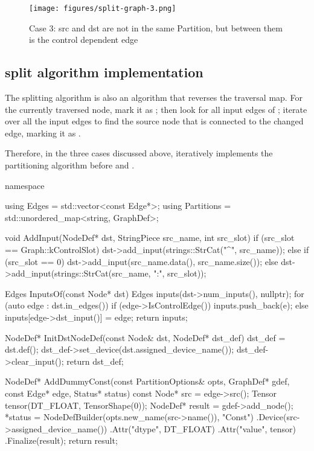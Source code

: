 \begin{content}
\begin{figure}[H]
\centering
\texttt{[image: figures/split-graph-3.png]}
\caption{Case 3: src and dst are not in the same Partition, but between them is the control dependent edge}
 \label{fig:split-graph-3}
\end{figure}

\subsection{split algorithm implementation}

The splitting algorithm is also an algorithm that reverses the traversal map. For the currently traversed node, mark it as ; then look for all input edges of ; iterate over all the input edges to find the source node that is connected to the changed edge, marking it as .

Therefore, in the three cases discussed above, iteratively implements the  partitioning algorithm before  and .

\begin{leftbar}
\begin{c++}
namespace {
  
  using Edges = std::vector<const Edge*>;
  using Partitions = std::unordered_map<string, GraphDef>;

  void AddInput(NodeDef* dst, StringPiece src_name, int src_slot) {
    if (src_slot == Graph::kControlSlot) {
      dst->add_input(strings::StrCat("^", src_name));
    } else if (src_slot == 0) {
      dst->add_input(src_name.data(), src_name.size());
    } else {
      dst->add_input(strings::StrCat(src_name, ":", src_slot));
    }
  }

  Edges InputsOf(const Node* dst) {
    Edges inputs(dst->num_inputs(), nullptr);
    for (auto edge : dst.in_edges()) {
      if (edge->IsControlEdge()) {
        inputs.push_back(e);
      } else {
        inputs[edge->dst_input()] = edge;
      }
    }
    return inputs;
  }

  NodeDef* InitDstNodeDef(const Node& dst, NodeDef* dst_def) {
    dst_def = dst.def();
    dst_def->set_device(dst.assigned_device_name());
    dst_def->clear_input();
    return dst_def;  
  }

  NodeDef* AddDummyConst(const PartitionOptions& opts, GraphDef* gdef,
                         const Edge* edge, Status* status) {
    const Node* src = edge->src();
    Tensor tensor(DT_FLOAT, TensorShape({0}));
    NodeDef* result = gdef->add_node();
    *status = NodeDefBuilder(opts.new_name(src->name()), "Const")
                  .Device(src->assigned_device_name())
                  .Attr("dtype", DT_FLOAT)
                  .Attr("value", tensor)
                  .Finalize(result);
    return result;
  }

}
\end{c++}
\end{leftbar}
\end{content}
